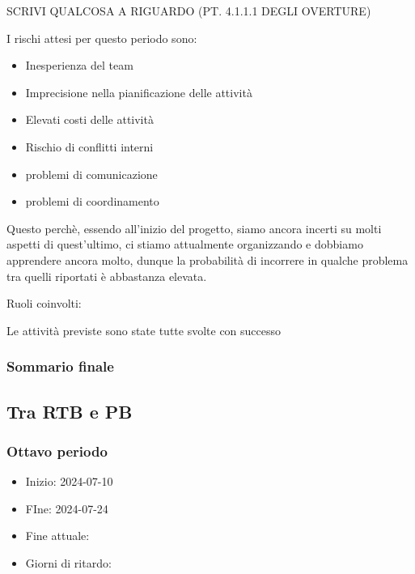 SCRIVI QUALCOSA A RIGUARDO (PT. 4.1.1.1 DEGLI OVERTURE)

I rischi attesi per questo periodo sono:
\begin{itemize}
    \item Inesperienza del team
    \item Imprecisione nella pianificazione delle attività
    \item Elevati costi delle attività
    \item Rischio di conflitti interni 
    \item problemi di comunicazione
    \item problemi di coordinamento
\end{itemize}
Questo perchè, essendo all’inizio del progetto, siamo ancora incerti su molti aspetti di quest’ultimo, ci stiamo attualmente organizzando e dobbiamo apprendere ancora molto, dunque la probabilità di incorrere in qualche problema tra quelli riportati è abbastanza elevata.

Ruoli coinvolti:

Le attività previste sono state tutte svolte con successo





\subsubsection{Sommario finale}






\subsection{Tra RTB e PB}

\subsubsection{Ottavo periodo}
\begin{itemize}
    \item Inizio: 2024-07-10
    \item FIne: 2024-07-24
    \item Fine attuale:
    \item Giorni di ritardo:
\end{itemize}

